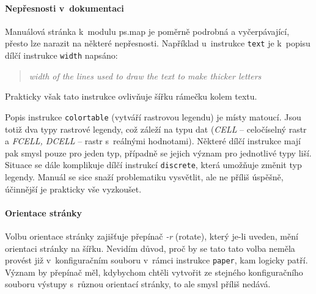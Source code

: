 \documentclass[a4paper,12pt,draft]{article}
\newcommand{\instr}[1]{\lstinline[style=psmapInline]|#1|}
\begin{document}
\paragraph*{Nepřesnosti v~dokumentaci}
\label{sec:psmap:manual}
Manuálová stránka \cite{manual} k~modulu ps.map je po\-měrně
podrobná a vyčerpávající, přesto lze narazit na některé
nepřesnosti. Například u~instrukce \instr{text} je k~popisu dílčí
instrukce \instr{width} napsáno:
 \begin{quotation}\it
width of the lines used to draw the text to make thicker letters
\end{quotation}
Prakticky však tato instrukce ovlivňuje šířku rámečku kolem textu.

Popis instrukce \instr{colortable} (vytváří rastrovou legendu) je místy
matoucí. Jsou totiž dva typy rastrové legendy, což záleží na typu dat
(\emph{CELL} -- celočíselný rastr a \emph{FCELL, DCELL} -- 
rastr s~reálnými hodnotami). Některé dílčí instrukce mají pak smysl pouze pro
jeden typ,
případně se jejich význam pro jednotlivé typy liší. Situace se dále
komplikuje dílčí instrukcí \instr{discrete}, která umožňuje změnit
typ legendy. Manuál se sice snaží problematiku vysvětlit, ale ne příliš
úspěšně, účinnější je prakticky vše vyzkoušet.


\paragraph*{Orientace stránky}
Volbu orientace stránky zajišťuje přepínač \emph{-r} (rotate), který
je-li uveden, mění orientaci stránky na šířku. Nevidím důvod, proč by
se tato tato volba neměla provést již v~konfiguračním souboru v~rámci
instrukce \instr{paper}, kam logicky patří. Význam by přepínač měl,
kdybychom chtěli vytvořit ze stejného konfiguračního souboru výstupy
s~různou orientací stránky, to ale smysl příliš nedává.




\end{document}
